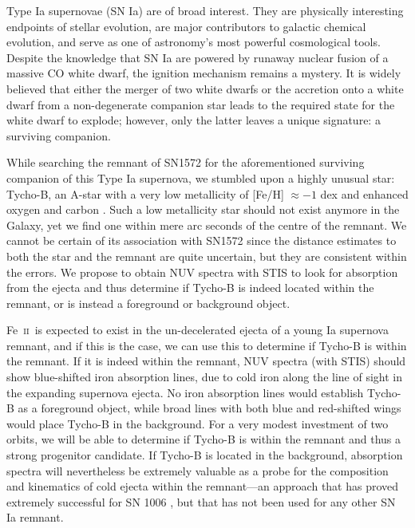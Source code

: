 \documentclass[12pt]{article}
\newcommand{\feii}{Fe~\textsc{ii}}
\begin{document}
%
%
\justification

Type Ia supernovae (SN Ia) are of broad interest. They are physically interesting endpoints of stellar evolution, are major contributors to galactic chemical evolution, and serve as one of astronomy's most powerful cosmological tools. 
Despite the knowledge that SN Ia are powered by runaway nuclear fusion of a massive CO white dwarf, the ignition mechanism remains a mystery. It is widely believed that either the merger of two white dwarfs or the accretion onto a white dwarf from a non-degenerate companion star leads to the required state for the white dwarf to explode; however, only the latter leaves a unique signature: a surviving companion.

While searching the remnant of SN1572 for the aforementioned surviving companion of this Type Ia supernova,  we stumbled upon a highly unusual star: Tycho-B, an A-star with a very low metallicity of [Fe/H] $\approx -1$ dex \citep{2012arXiv1210.2713K} and enhanced oxygen and carbon \citep{2012arXiv1210.2713K}. Such a low metallicity star should not exist anymore in the Galaxy, yet we find one within mere arc seconds of the centre of the remnant. We cannot be certain of its association with SN1572 since the distance estimates to both the star and the remnant are quite uncertain, but they are consistent within the errors.   We propose to obtain NUV spectra with STIS  to look for absorption from the ejecta and thus determine if Tycho-B is indeed located within the remnant,  or is instead a foreground or background object.

\feii\ is expected to exist in the un-decelerated ejecta of a young Ia supernova remnant, and if this is the case, we can use this  to determine if Tycho-B is within the remnant.
If it is indeed within the remnant, NUV spectra (with STIS) should show blue-shifted iron absorption lines, due to cold iron along the line of sight in the  expanding supernova ejecta. No iron absorption lines would establish Tycho-B as a foreground object, while broad lines with both blue and red-shifted wings would place Tycho-B in the background. For a very modest investment of two orbits, we will be able to determine if Tycho-B is within the remnant and thus a strong progenitor candidate. If Tycho-B is located in the background, absorption spectra will nevertheless be extremely valuable as a probe for the composition and kinematics of cold ejecta within the remnant---an approach that has proved extremely successful for SN 1006 \citep[e.g.][]{1988ApJ...327..164F,1993ApJ...416..247W,2005ApJ...624..189W}, but that has not been used for any other SN Ia remnant.
\end{document}
